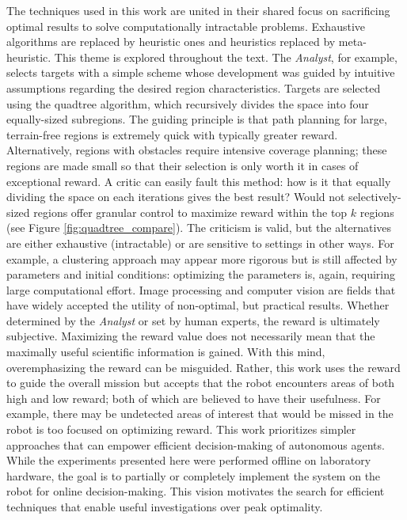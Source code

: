 \documentclass{tamuccthesis}
\begin{document}
The techniques used in this work are united in their shared focus on sacrificing optimal results to solve computationally intractable problems. Exhaustive algorithms are replaced by heuristic ones and heuristics replaced by meta-heuristic. This theme is explored throughout the text. The \textit{Analyst}, for example, selects targets with a simple scheme whose development was guided by intuitive assumptions regarding the desired region characteristics. Targets are selected using the quadtree algorithm, which recursively divides the space into four equally-sized subregions. The guiding principle is that path planning for large, terrain-free regions is extremely quick with typically greater reward. Alternatively, regions with obstacles require intensive coverage planning; these regions are made small so that their selection is only worth it in cases of exceptional reward. A critic can easily fault this method: how is it that equally dividing the space on each iterations gives the best result? Would not selectively-sized regions offer granular control to maximize reward within the top $k$ regions (see Figure \ref{fig:quadtree_compare}). The criticism is valid, but the alternatives are either exhaustive (intractable) or are sensitive to settings in other ways. For example, a clustering approach may appear more rigorous but is still affected by parameters and initial conditions: optimizing the parameters is, again, requiring large computational effort. Image processing and computer vision are fields that have widely accepted the utility of non-optimal, but practical results. Whether determined by the \textit{Analyst} or set by human experts, the reward is ultimately subjective. Maximizing the reward value does not necessarily mean that the maximally useful scientific information is gained. With this mind, overemphasizing the reward can be misguided. Rather, this work uses the reward to guide the overall mission but accepts that the robot encounters areas of both high and low reward; both of which are believed to have their usefulness. For example, there may be undetected areas of interest that would be missed in the robot is too focused on optimizing reward. This work prioritizes simpler approaches that can empower efficient decision-making of autonomous agents.  While the experiments presented here were performed offline on laboratory hardware, the goal is to partially or completely implement the system on the robot for online decision-making. This vision motivates the search for efficient techniques that enable useful investigations over peak optimality. 
\end{document}
